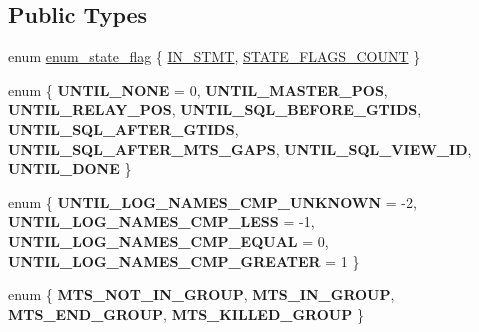 \subsection*{Public Types}
\begin{DoxyCompactItemize}
\item 
enum \mbox{\hyperlink{classRelay__log__info_a768d1f6426a20be0e32d7380a231c0b2}{enum\+\_\+state\+\_\+flag}} \{ \mbox{\hyperlink{classRelay__log__info_a768d1f6426a20be0e32d7380a231c0b2a6e9fdb2f902d88e174ae5a30e50156dc}{I\+N\+\_\+\+S\+T\+MT}}, 
\mbox{\hyperlink{classRelay__log__info_a768d1f6426a20be0e32d7380a231c0b2aadc21306da0de395bfdc26d20e3c59b7}{S\+T\+A\+T\+E\+\_\+\+F\+L\+A\+G\+S\+\_\+\+C\+O\+U\+NT}}
 \}
\item 
\mbox{\label{classRelay__log__info_a2072272258d68b26c076f6935d33f3fa}} 
enum \{ \newline
{\bfseries U\+N\+T\+I\+L\+\_\+\+N\+O\+NE} = 0, 
{\bfseries U\+N\+T\+I\+L\+\_\+\+M\+A\+S\+T\+E\+R\+\_\+\+P\+OS}, 
{\bfseries U\+N\+T\+I\+L\+\_\+\+R\+E\+L\+A\+Y\+\_\+\+P\+OS}, 
{\bfseries U\+N\+T\+I\+L\+\_\+\+S\+Q\+L\+\_\+\+B\+E\+F\+O\+R\+E\+\_\+\+G\+T\+I\+DS}, 
\newline
{\bfseries U\+N\+T\+I\+L\+\_\+\+S\+Q\+L\+\_\+\+A\+F\+T\+E\+R\+\_\+\+G\+T\+I\+DS}, 
{\bfseries U\+N\+T\+I\+L\+\_\+\+S\+Q\+L\+\_\+\+A\+F\+T\+E\+R\+\_\+\+M\+T\+S\+\_\+\+G\+A\+PS}, 
{\bfseries U\+N\+T\+I\+L\+\_\+\+S\+Q\+L\+\_\+\+V\+I\+E\+W\+\_\+\+ID}, 
{\bfseries U\+N\+T\+I\+L\+\_\+\+D\+O\+NE}
 \}
\item 
\mbox{\label{classRelay__log__info_a837a066d30b8d614df2602beb2eb8c94}} 
enum \{ {\bfseries U\+N\+T\+I\+L\+\_\+\+L\+O\+G\+\_\+\+N\+A\+M\+E\+S\+\_\+\+C\+M\+P\+\_\+\+U\+N\+K\+N\+O\+WN} = -\/2, 
{\bfseries U\+N\+T\+I\+L\+\_\+\+L\+O\+G\+\_\+\+N\+A\+M\+E\+S\+\_\+\+C\+M\+P\+\_\+\+L\+E\+SS} = -\/1, 
{\bfseries U\+N\+T\+I\+L\+\_\+\+L\+O\+G\+\_\+\+N\+A\+M\+E\+S\+\_\+\+C\+M\+P\+\_\+\+E\+Q\+U\+AL} = 0, 
{\bfseries U\+N\+T\+I\+L\+\_\+\+L\+O\+G\+\_\+\+N\+A\+M\+E\+S\+\_\+\+C\+M\+P\+\_\+\+G\+R\+E\+A\+T\+ER} = 1
 \}
\item 
\mbox{\label{classRelay__log__info_ad09fa70e13e2f7e2659b8fe51b08c5ad}} 
enum \{ {\bfseries M\+T\+S\+\_\+\+N\+O\+T\+\_\+\+I\+N\+\_\+\+G\+R\+O\+UP}, 
{\bfseries M\+T\+S\+\_\+\+I\+N\+\_\+\+G\+R\+O\+UP}, 
{\bfseries M\+T\+S\+\_\+\+E\+N\+D\+\_\+\+G\+R\+O\+UP}, 
{\bfseries M\+T\+S\+\_\+\+K\+I\+L\+L\+E\+D\+\_\+\+G\+R\+O\+UP}
 \}
\end{DoxyCompactItemize}
